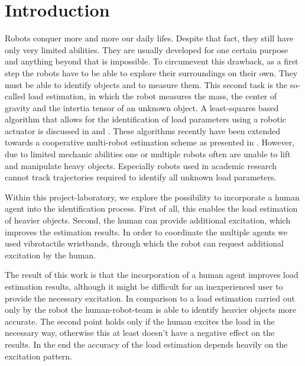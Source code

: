 

\chapter{Introduction}
Robots conquer more and more our daily lifes. Despite that fact, they still have only very limited abilities. They are usually developed for one certain purpose and anything beyond that is impossible. To circumevent this drawback, as a first step the robots have to be able to explore their surroundings on their own. They must be able to identify objects and to measure them. This second task is the so-called load estimation, in which the robot measures the mass, the center of gravity and the intertia tensor of an unknown object. A least-squares based algorithm that allows for the identification of load parameters using a robotic actuator is discussed in \cite{literaturstelle1} and \cite{literaturstelle2}. These algorithms recently have been extended towards a cooperative multi-robot estimation scheme as presented in \cite{literaturstelle3}. However, due to limited mechanic abilities one or multiple robots often are unable to lift and manipulate heavy objects. Especially robots used in academic research cannot track trajectories required to identify all unknown load parameters.

Within this project-laboratory, we explore the possibility to incorporate a human agent into the identification process. First of all, this enables the load estimation of heavier objects. Second, the human can provide additional excitation, which improves the estimation results. In order to coordinate the multiple agents we used vibrotactile wristbands, through which the robot can request additional excitation by the human.

The result of this work is that the incorporation of a human agent improves load estimation results, although it might be difficult for an inexperienced user to provide the necessary excitation. In comparison to a load estimation carried out only by the robot the human-robot-team is able to identify heavier objects more accurate. The second point holds only if the human excites the load in the necessary way, otherwise this at least doesn't have a negative effect on the results. In the end the accuracy of the load estimation depends heavily on the excitation pattern.
